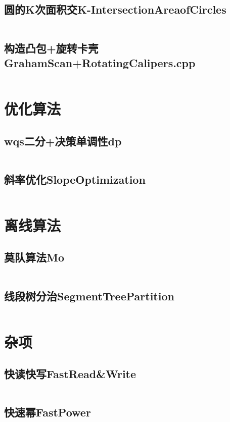 \documentclass[10pt,a4paper,twoside]{ctexbook}
\renewcommand{\_}{\textscale{1}{\textunderscore}} %
\begin{document}
\subsection{圆的K次面积交K-Intersection\_Area\_of\_Circles}
\inputminted{c++}{../Cpp/计算几何/圆的K次面积交K-Intersection_Area_of_Circles.cpp}
\subsection{构造凸包+旋转卡壳Graham\_Scan+Rotating\_Calipers.cpp}
\inputminted{c++}{../Cpp/计算几何/构造凸包+旋转卡壳Graham_Scan+Rotating_Calipers.cpp}
\newpage
\section{优化算法}
\subsection{wqs二分+决策单调性dp}
\inputminted{c++}{../Cpp/优化算法/wqs二分+决策单调性dp.cpp}
\subsection{斜率优化Slope\_Optimization}
\inputminted{c++}{../Cpp/优化算法/斜率优化Slope_Optimization.cpp}

\newpage
\section{离线算法}
\subsection{莫队算法Mo}
\inputminted{c++}{../Cpp/离线算法/莫队算法Mo.cpp}
\subsection{线段树分治Segment\_Tree\_Partition}
\inputminted{c++}{../Cpp/离线算法/线段树分治Segment_Tree_Partition.cpp}

\newpage
\section{杂项}
\subsection{快读快写Fast\_Read\&Write}
\inputminted{c++}{../Cpp/杂项/快读快写Fast_Read\&Write.cpp}
\subsection{快速幂Fast\_Power}
\inputminted{c++}{../Cpp/杂项/快速幂Fast_Power.cpp}
\end{document}
